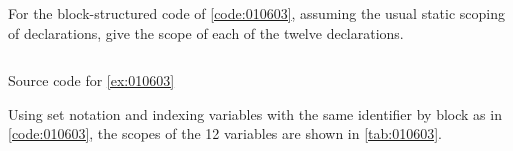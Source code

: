 \begin{exercise}\label{ex:010603}
    For the block-structured code of \cref{code:010603}, assuming the usual 
    static scoping of declarations, give the scope of each of the twelve 
    declarations.
    \begin{listing}[!ht]
    \inputminted[linenos=true,frame=single]{c}{01/06/03/ex010603.c}
    \caption{Source code for \cref{ex:010603}}
    \label{code:010603}
    \end{listing}
\end{exercise}
\begin{solution}\label{sol:010603}
    Using set notation and indexing variables with the same identifier by block as in 
    \cref{code:010603}, the scopes of the 12 variables are shown in \autoref{tab:010603}.
    
\end{solution}